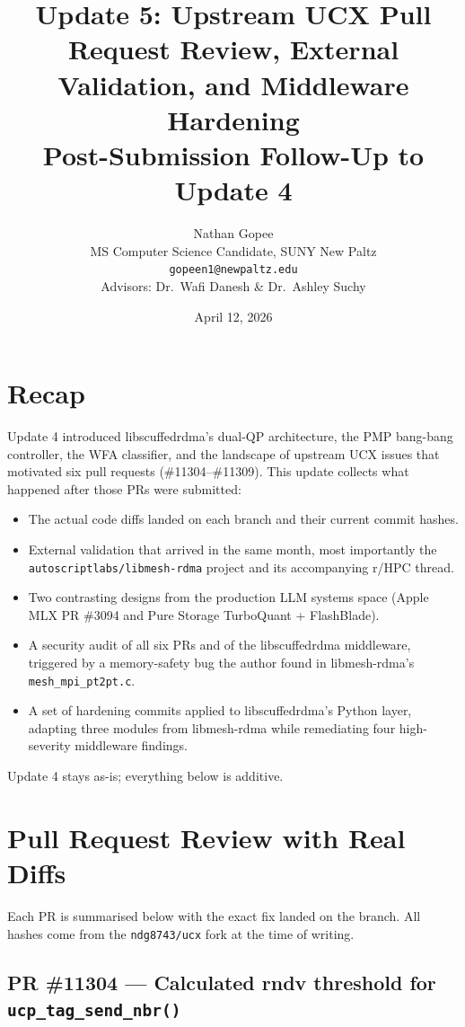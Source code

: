 \documentclass[11pt]{article}
\title{Update 5: Upstream UCX Pull Request Review, External Validation,
  and Middleware Hardening\\[4pt]
  \large Post-Submission Follow-Up to Update 4}
\author{Nathan Gopee\\MS Computer Science Candidate, SUNY New Paltz\\\texttt{gopeen1@newpaltz.edu}\\[4pt]Advisors: Dr.\ Wafi Danesh \& Dr.\ Ashley Suchy}
\date{April 12, 2026}
\begin{document}
\maketitle
\tableofcontents
\newpage

\section{Recap}

Update 4 introduced libscuffedrdma's dual-QP architecture, the PMP
bang-bang controller, the WFA classifier, and the landscape of upstream
UCX issues that motivated six pull requests (\#11304--\#11309). This
update collects what happened after those PRs were submitted:

\begin{itemize}
  \item The actual code diffs landed on each branch and their current
        commit hashes.
  \item External validation that arrived in the same month, most
        importantly the \texttt{autoscriptlabs/libmesh-rdma} project and
        its accompanying r/HPC thread.
  \item Two contrasting designs from the production LLM systems space
        (Apple MLX PR \#3094 and Pure Storage TurboQuant + FlashBlade).
  \item A security audit of all six PRs and of the libscuffedrdma
        middleware, triggered by a memory-safety bug the author found
        in libmesh-rdma's \texttt{mesh\_mpi\_pt2pt.c}.
  \item A set of hardening commits applied to libscuffedrdma's Python
        layer, adapting three modules from libmesh-rdma while
        remediating four high-severity middleware findings.
\end{itemize}

Update 4 stays as-is; everything below is additive.

\section{Pull Request Review with Real Diffs}

Each PR is summarised below with the exact fix landed on the branch.
All hashes come from the \texttt{ndg8743/ucx} fork at the time of
writing.

\subsection{PR \#11304 --- Calculated rndv threshold for \texttt{ucp\_tag\_send\_nbr()}}
\label{sec:pr_11304}
\end{document}
